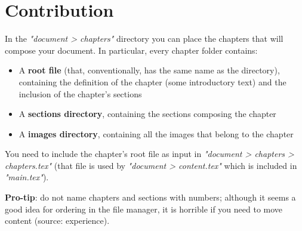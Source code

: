 \chapter{Contribution}\label{contribution}
In the \textit{"document > chapters"} directory you can place the chapters that will compose your document.
In particular, every chapter folder contains:
\begin{itemize}
    \item A \textbf{root file} (that, conventionally, has the same name as the directory), containing the definition of the chapter (some introductory text) and the inclusion of the chapter's sections
    \item A \textbf{sections directory}, containing the sections composing the chapter
    \item A \textbf{images directory}, containing all the images that belong to the chapter
\end{itemize}

You need to include the chapter's root file as input in \textit{"document > chapters > chapters.tex"} (that file is used by \textit{"document > content.tex"} which is included in \textit{"main.tex"}).

\textbf{Pro-tip}: do not name chapters and sections with numbers; although it seems a good idea for ordering in the file manager, it is horrible if you need to move content (source: experience).
